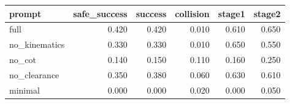 \begin{tabular}{lrrrrr}
\toprule
prompt & safe_success & success & collision & stage1 & stage2 \\
\midrule
full & 0.420 & 0.420 & 0.010 & 0.610 & 0.650 \\
no_kinematics & 0.330 & 0.330 & 0.010 & 0.650 & 0.550 \\
no_cot & 0.140 & 0.150 & 0.110 & 0.160 & 0.250 \\
no_clearance & 0.350 & 0.380 & 0.060 & 0.630 & 0.610 \\
minimal & 0.000 & 0.000 & 0.020 & 0.000 & 0.050 \\
\bottomrule
\end{tabular}
